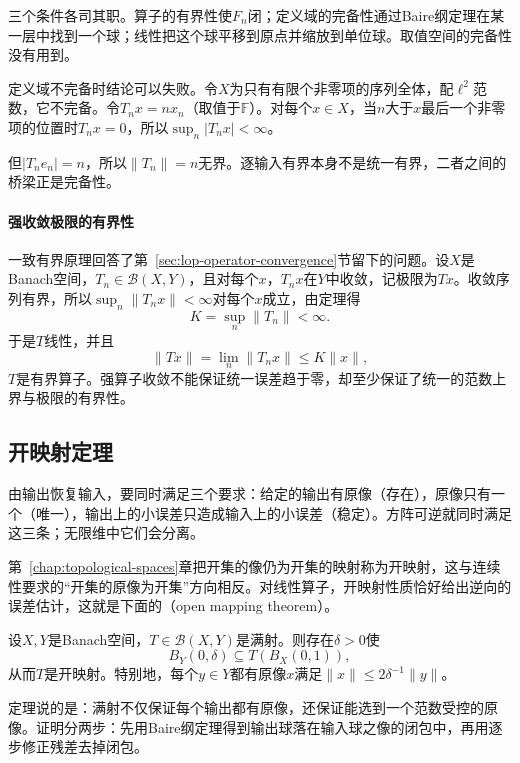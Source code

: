三个条件各司其职。算子的有界性使$F_n$闭；定义域的完备性通过Baire纲定理在某一层中找到一个球；线性把这个球平移到原点并缩放到单位球。取值空间的完备性没有用到。

定义域不完备时结论可以失败。令$X$为只有有限个非零项的序列全体，配$\ell^2$范数，它不完备。令$T_nx=nx_n$（取值于$\mathbb F$）。对每个$x\in X$，当$n$大于$x$最后一个非零项的位置时$T_nx=0$，所以$\sup_n\lvert T_nx\rvert<\infty$。

但$\lvert T_ne_n\rvert=n$，所以$\lVert T_n\rVert=n$无界。逐输入有界本身不是统一有界，二者之间的桥梁正是完备性。

\paragraph{强收敛极限的有界性}
一致有界原理回答了第~\ref{sec:lop-operator-convergence}节留下的问题。设$X$是Banach空间，$T_n\in\mathcal B(X,Y)$，且对每个$x$，$T_nx$在$Y$中收敛，记极限为$Tx$。收敛序列有界，所以$\sup_n\lVert T_nx\rVert<\infty$对每个$x$成立，由定理得
\[
 K=\sup_n\lVert T_n\rVert<\infty.
\]
于是$T$线性，并且
\[
 \lVert Tx\rVert=\lim_n\lVert T_nx\rVert\leq K\lVert x\rVert,
\]
$T$是有界算子。强算子收敛不能保证统一误差趋于零，却至少保证了统一的范数上界与极限的有界性。

\subsection{开映射定理}
\label{sec:lop-open-mapping}

由输出恢复输入，要同时满足三个要求：给定的输出有原像（存在），原像只有一个（唯一），输出上的小误差只造成输入上的小误差（稳定）。方阵可逆就同时满足这三条；无限维中它们会分离。

第~\ref{chap:topological-spaces}章把开集的像仍为开集的映射称为开映射，这与连续性要求的“开集的原像为开集”方向相反。对线性算子，开映射性质恰好给出逆向的误差估计，这就是下面的（open mapping theorem）。

\begin{theorem}[开映射定理]
\label{thm:lop-open-mapping}
设$X,Y$是Banach空间，$T\in\mathcal B(X,Y)$是满射。则存在$\delta>0$使
\begin{equation}
 B_Y(0,\delta)\subseteq T(B_X(0,1)),
 \label{eq:lop-open-mapping}
\end{equation}
从而$T$是开映射。特别地，每个$y\in Y$都有原像$x$满足$\lVert x\rVert\leq2\delta^{-1}\lVert y\rVert$。
\end{theorem}

定理说的是：满射不仅保证每个输出都有原像，还保证能选到一个范数受控的原像。证明分两步：先用Baire纲定理得到输出球落在输入球之像的闭包中，再用逐步修正残差去掉闭包。


